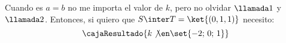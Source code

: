 \begin{enumerate}[label=(\alph*)]
        Cuando es $a = b$ no me importa el valor de $k$,  pero no olvidar $\llamada1$ y $\llamada2$.
        Entonces, si quiero que $S \inter T = \ket{(0,1,1)}$ necesito:
        $$
          \cajaResultado{
                  k \not\en \set{-2;\, 0;\, 1} 
          }
        $$
\end{enumerate}

\begin{aportes}
  \item {}
\end{aportes}
